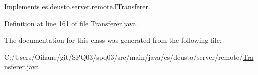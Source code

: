 Implements \hyperlink{interfacees_1_1deusto_1_1server_1_1remote_1_1_i_transferer_ab43399cfce0d84f6e27032a7c14865f6}{es.\+deusto.\+server.\+remote.\+I\+Transferer}.



Definition at line 161 of file Transferer.\+java.



The documentation for this class was generated from the following file\+:\begin{DoxyCompactItemize}
\item 
C\+:/\+Users/\+Oihane/git/\+S\+P\+Q03/spq03/src/main/java/es/deusto/server/remote/\hyperlink{_transferer_8java}{Transferer.\+java}\end{DoxyCompactItemize}
